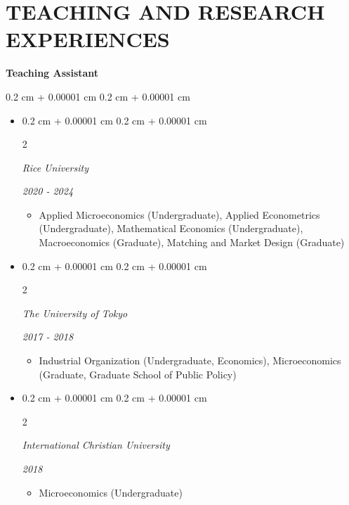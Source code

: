 \documentclass[10pt, letterpaper]{article}
\newenvironment{highlights}{
    \begin{itemize}[
        topsep=0.10 cm,
        parsep=0.10 cm,
        partopsep=0pt,
        itemsep=0.0 cm,
        leftmargin=0.4 cm + 10pt
    ]
}{
    \end{itemize}
} %
\newenvironment{onecolentry}{
    \begin{adjustwidth}{
        0.2 cm + 0.00001 cm
    }{
        0.2 cm + 0.00001 cm
    }
}{
    \end{adjustwidth}
} %
\newenvironment{twocolentry}[2][]{
    \onecolentry
    \def\secondColumn{#2}
    \setcolumnwidth{\fill, 4.5 cm}
    \begin{paracol}{2}
}{
    \switchcolumn \raggedleft \secondColumn
    \end{paracol}
    \endonecolentry
} %
\begin{document}
    \section{TEACHING AND RESEARCH EXPERIENCES}
    \textbf{Teaching Assistant}
    \vspace{0.10 cm}
    \begin{onecolentry}
        \begin{highlights}
            \item \begin{twocolentry}{
                \textit{2020 - 2024}}
                \textit{Rice University}
            \end{twocolentry}
            \begin{highlights}
                \item Applied Microeconomics (Undergraduate), Applied Econometrics (Undergraduate), Mathematical Economics (Undergraduate), Macroeconomics (Graduate), Matching and Market Design (Graduate)
            \end{highlights}
            \item \begin{twocolentry}{
                \textit{2017 - 2018}}
                \textit{The University of Tokyo}
            \end{twocolentry}
            \begin{highlights}
                \item Industrial Organization (Undergraduate, Economics), Microeconomics (Graduate, Graduate School of Public Policy)
            \end{highlights}
            \item \begin{twocolentry}{
                \textit{2018}}
                \textit{International Christian University}
            \end{twocolentry}
            \begin{highlights}
                \item Microeconomics (Undergraduate)
            \end{highlights}
        \end{highlights}
    \end{onecolentry}
\end{document}
